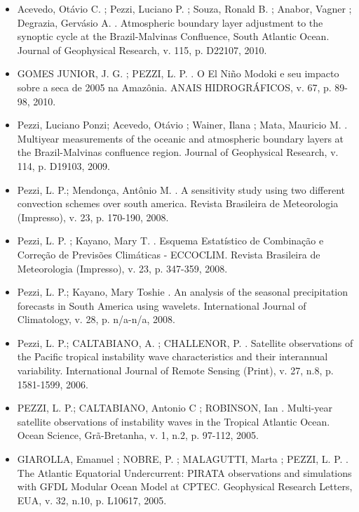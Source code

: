 \documentclass[11pt, a4paper]{awesome-cv}
\begin{document}
\begin{cvletter}
\begin{itemize}
  \item[] Acevedo, Otávio C. ; Pezzi, Luciano P. ; Souza, Ronald B. ; Anabor, Vagner ; Degrazia, 
  Gervásio A. . Atmospheric boundary layer adjustment to the synoptic cycle at the Brazil-Malvinas 
  Confluence, South Atlantic Ocean. Journal of Geophysical Research, v. 115, p. D22107,
  2010.

  \item[] GOMES JUNIOR, J. G. ; PEZZI, L. P. . O El Niño Modoki e seu impacto sobre a seca de 2005 na 
  Amazônia. ANAIS HIDROGRÁFICOS, v. 67, p. 89-98, 2010. 

  \item[] Pezzi, Luciano Ponzi; Acevedo, Otávio ; Wainer, Ilana ; Mata, Mauricio M. . Multiyear 
  measurements of the oceanic and atmospheric boundary layers at the Brazil-Malvinas confluence region.
  Journal of Geophysical Research, v. 114, p. D19103, 2009.

  \item[] Pezzi, L. P.; Mendonça, Antônio M. . A sensitivity study using two different convection 
  schemes over south america. Revista Brasileira de Meteorologia (Impresso), v. 23, p. 170-190, 
  2008.

  \item[] Pezzi, L. P. ; Kayano, Mary T. . Esquema Estatístico de Combinação e Correção de Previsões 
  Climáticas - ECCOCLIM. Revista Brasileira de Meteorologia (Impresso), v. 23, p. 347-359,
  2008.

  \item[] Pezzi, L. P.; Kayano, Mary Toshie . An analysis of the seasonal precipitation forecasts in 
  South America using wavelets. International Journal of Climatology, v. 28, p. n/a-n/a, 2008.

  \item[] Pezzi, L. P.; CALTABIANO, A. ; CHALLENOR, P. . Satellite observations of the Pacific tropical 
  instability wave characteristics and their interannual variability. International Journal of 
  Remote Sensing (Print), v. 27, n.8, p. 1581-1599,
  2006.

  \item[] PEZZI, L. P.; CALTABIANO, Antonio C ; ROBINSON, Ian . Multi-year satellite observations of 
  instability waves in the Tropical Atlantic Ocean. Ocean Science, Grã-Bretanha, v. 1, n.2, p. 
  97-112, 2005.

  \item[] GIAROLLA, Emanuel ; NOBRE, P. ; MALAGUTTI, Marta ; PEZZI, L. P. . The Atlantic Equatorial 
  Undercurrent: PIRATA observations and simulations with GFDL Modular Ocean Model at CPTEC. 
  Geophysical Research Letters, EUA, v. 32, n.10, p. L10617, 2005.


\end{itemize}
\end{cvletter}
\end{document}
